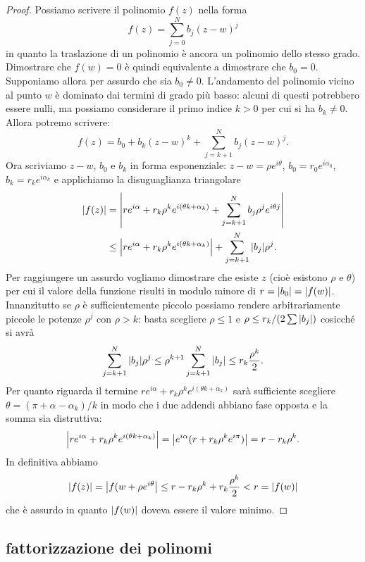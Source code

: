 \begin{proof}
  Possiamo scrivere il polinomio $f(z)$ nella forma
  \[
    f(z) = \sum_{j=0}^N b_j (z-w)^j
  \]
  in quanto la traslazione di un polinomio è ancora un polinomio dello stesso 
  grado.
  Dimostrare che $f(w)=0$ è quindi equivalente a dimostrare che $b_0=0$.
  Supponiamo allora per assurdo che sia $b_0\neq 0$. 
  L'andamento del polinomio vicino al punto $w$ è dominato dai termini di grado 
  più basso: alcuni di questi potrebbero essere nulli, ma possiamo considerare 
  il primo indice $k>0$ per cui si ha $b_k\neq 0$. Allora potremo scrivere:
  \[
      f(z) = b_0 + b_k(z-w)^k + \sum_{j=k+1}^N b_j (z-w)^j.
  \]
Ora scriviamo $z-w$, $b_0$ e $b_k$ in forma esponenziale:
$z - w = \rho e^{i\theta}$, $b_0 = r_0 e^{i \alpha_0}$,
$b_k = r_k e^{i\alpha_k}$ 
e applichiamo la disuguaglianza triangolare
  \begin{align*}
    {\left|f(z)\right|} 
    &= {\left|r e^{i\alpha} + r_k \rho^k e^{i(\theta k+\alpha_k)} 
    + \sum_{j=k+1}^N b_j \rho^j e^{i\theta j}\right|} \\
    &\le {\left|r e^{i\alpha} + r_k \rho^k e^{i(\theta k + \alpha_k )}\right|} 
    + \sum_{j=k+1}^N {\left|b_j\right|} \rho^j.
  \end{align*}
Per raggiungere un assurdo vogliamo dimostrare che esiste $z$ (cioè esistono $\rho$ e $\theta$)
per cui il valore della funzione risulti in modulo minore di $r = {\left|b_0\right|} = {\left|f(w)\right|}$.
Innanzitutto se $\rho$ è sufficientemente piccolo possiamo rendere arbitrariamente piccole 
le potenze $\rho^j$ con $\rho>k$: basta scegliere $\rho\le 1$ 
e $\rho \le r_k/(2\sum {\left|b_j\right|})$
cosicché si avrà 
\[
  \sum_{j=k+1}^N {\left|b_j\right|} \rho^j
  \le \rho^{k+1} \sum_{j=k+1}^N {\left|b_j\right|} \le r_k\frac{\rho^{k}}{2}.
\]
Per quanto riguarda il termine
$r e^{i\alpha} + r_k \rho^k e^{i(\theta k + \alpha_k)}$ 
sarà sufficiente scegliere $\theta = (\pi + \alpha - \alpha_k) /k$ 
in modo che i due addendi 
abbiano fase opposta e la somma sia distruttiva:
\[
  {\left|r e^{i\alpha} + r_k \rho^k e^{i(\theta k + \alpha_k)}\right|}
  = {\left|e^{i\alpha}(r + r_k \rho^k e^{i\pi})\right|}
  = r - r_k\rho^k.
\]
In definitiva abbiamo
\[
{\left|f(z)\right|} = {\left|f(w+\rho e^{i\theta}\right|} 
\le r - r_k\rho^k + r_k\frac{\rho^k}{2} 
< r = {\left|f(w)\right|}
\]
che è assurdo in quanto ${\left|f(w)\right|}$ doveva essere il valore minimo.
\end{proof}
  
\subsection{fattorizzazione dei polinomi}

